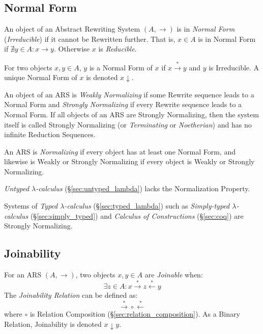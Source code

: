\subsection{Normal Form}\label{sec:normal_form}

An object of an Abstract Rewriting System $(A,\rightarrow)$ is in
\emph{Normal Form} (\emph{Irreducible}) if it cannot be Rewritten
further. That is, $x \in A$ is in Normal Form if $\nexists y \in A : x
\rightarrow y$. Otherwise $x$ is \emph{Reducible}.

For two objects $x,y \in A$, $y$ is a Normal Form of $x$ if $x
\stackrel{*}{\rightarrow} y$ and $y$ is Irreducible. A unique Normal
Form of $x$ is denoted $x \downarrow$.

An object of an ARS is \emph{Weakly Normalizing} if some Rewrite
sequence leads to a Normal Form and \emph{Strongly Normalizing} if
every Rewrite sequence leads to a Normal Form. If all objects of an
ARS are Strongly Normalizing, then the system itself is called
Strongly Normalizing (or \emph{Terminating} or \emph{Noetherian}) and
has no infinite Reduction Sequences.

An ARS is \emph{Normalizing} if every object has at least one Normal
Form, and likewise is Weakly or Strongly Normalizing if every object
is Weakly or Strongly Normalizing.

\emph{Untyped $\lambda$-calculus} (\S\ref{sec:untyped_lambda}) lacks
the Normalization Property.

Systems of \emph{Typed $\lambda$-calculus} (\S\ref{sec:typed_lambda})
such as \emph{Simply-typed $\lambda$-calculus}
(\S\ref{sec:simply_typed}) and \emph{Calculus of Constructions}
(\S\ref{sec:coq}) are Strongly Normalizing.



\subsection{Joinability}\label{sec:rewrite_join}

For an ARS $(A, \rightarrow)$, two objects $x,y\in A$ are
\emph{Joinable} when:
\[
    \exists z \in A :
    x \stackrel{*}\rightarrow z \stackrel{*}\leftarrow y
\]
The \emph{Joinability Relation} can be defined as:
\[
    \stackrel{*}\rightarrow \circ \stackrel{*}\leftarrow
\]
where $\circ$ is Relation Composition
(\S\ref{sec:relation_composition}). As a Binary Relation, Joinability
is denoted $x \downarrow y$.

